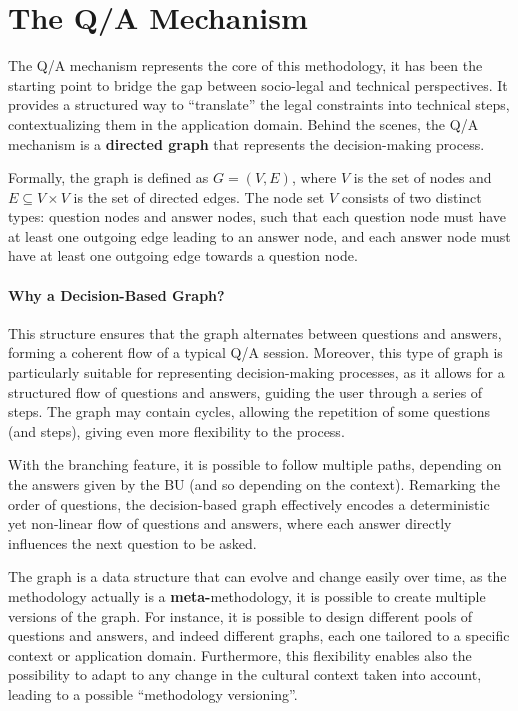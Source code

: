 \documentclass[12pt,a4paper,openright,twoside]{book}
\begin{document}
\section{The \acs{Q/A} Mechanism}

The \acf{Q/A} mechanism represents the core of this methodology, it has been the starting point to bridge the gap between socio-legal and technical perspectives.
%
It provides a structured way to ``translate'' the legal constraints into technical steps, contextualizing them in the application domain.
%
Behind the scenes, the \ac{Q/A} mechanism is a \textbf{directed graph} that represents the decision-making process.

Formally, the graph is defined as $G = (V, E)$, where $V$ is the set of nodes and $E \subseteq V \times V$ is the set of directed edges.
%
The node set $V$ consists of two distinct types: question nodes and answer nodes, such that each question node must have at least one outgoing edge leading to an answer node, and each answer node must have at least one outgoing edge towards a question node.


\paragraph{Why a Decision-Based Graph?}
This structure ensures that the graph alternates between questions and answers, forming a coherent flow of a typical \ac{Q/A} session.
%
Moreover, this type of graph is particularly suitable for representing decision-making processes, as it allows for a structured flow of questions and answers, guiding the user through a series of steps.
%
The graph may contain cycles, allowing the repetition of some questions (and steps), giving even more flexibility to the process.

With the branching feature, it is possible to follow multiple paths, depending on the answers given by the \acf{BU} (and so depending on the context).
%
Remarking the order of questions, the decision-based graph effectively encodes a deterministic yet non-linear flow of questions and answers, where each answer directly influences the next question to be asked.

The graph is a data structure that can evolve and change easily over time, as the methodology actually is a \textbf{meta-}methodology, it is possible to create multiple versions of the graph.
%
For instance, it is possible to design different pools of questions and answers, and indeed different graphs, each one tailored to a specific context or application domain.
%
Furthermore, this flexibility enables also the possibility to adapt to any change in the cultural context taken into account, leading to a possible ``methodology versioning''.
\end{document}
